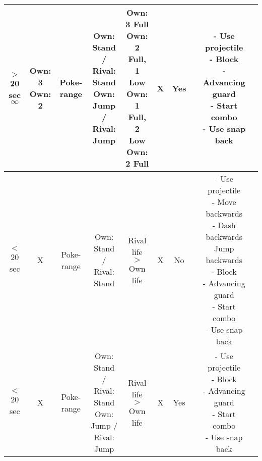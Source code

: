 \documentclass{article}
\begin{document}
\begin{landscape}
\begin{table}[h!]
\begin{center}
\begin{tabular*}{24cm}{c|c|c|c|c|c|c|c|c|c}
      \hline
      \makecell{$>$ 20 sec \\ $\infty$} & \makecell {Own: 3 \\ Own: 2} & Poke-range & \makecell{Own: Stand / Rival: Stand \\ Own: Jump / Rival: Jump} & \makecell {Own: 3 Full \\ Own: 2 Full, 1 Low \\ Own: 1 Full, 2 Low \\ Own: 2 Full} & X & Yes & & \makecell{- Use projectile \\ - Block \\ - Advancing guard \\ - Start combo \\ - Use snap back}\\
      \hline
      $<$ 20 sec & X & Poke-range & Own: Stand / Rival: Stand & Rival life $>$ Own life & X & No & & \makecell{- Use projectile \\ - Move backwards \\ - Dash backwards \\ Jump backwards \\ - Block \\ - Advancing guard \\ - Start combo \\ - Use snap back}\\
      \hline
      $<$ 20 sec & X & Poke-range & \makecell{Own: Stand / Rival: Stand \\ Own: Jump / Rival: Jump} & Rival life $>$ Own life & X & Yes & & \makecell{- Use projectile \\ - Block \\ - Advancing guard \\ - Start combo \\ - Use snap back}\\
      \hline
  \end{tabular*}
  \end{center}
\end{table}

\end{landscape}

\newpage
\end{document}

